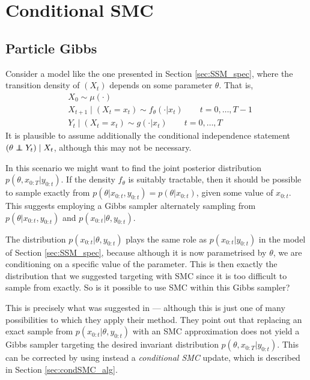 \documentclass[fleqn]{article}
\theoremstyle{definition}
\newcommand\indep{\protect\mathpalette{\protect\independenT}{\perp}}
\def\independenT#1#2{\mathrel{\rlap{$#1#2$}\mkern2mu{#1#2}}}
\begin{document}
\section{Conditional SMC}\label{sec:conditionalSMC}

\subsection{Particle Gibbs}
Consider a model like the one presented in Section \ref{sec:SSM_spec}, where the transition density of $(X_t)$ depends on some parameter $\theta$. That is,
\begin{align*}
& X_0 \sim \mu(\cdot) \\
& X_{t+1} \mid (X_t = x_t) \sim f_{\theta}(\cdot | x_t)  \qquad t=0,\dots,T-1 \\
& Y_t \mid (X_t = x_t) \sim g(\cdot | x_t) \qquad t=0,\dots,T
\end{align*}
It is plausible to assume additionally the conditional independence statement $(\theta \indep Y_t) \mid X_t$, although this may not be necessary.

In this scenario we might want to find the joint posterior distribution $p(\theta, x_{0:T} | y_{0:t})$.
If the density $f_\theta$ is suitably tractable, then it should be possible to sample exactly from $p(\theta | x_{0:t}, y_{0:t}) = p(\theta | x_{0:t})$, given some value of $x_{0:t}$.
This suggests employing a Gibbs sampler alternately sampling from $p(\theta | x_{0:t}, y_{0:t})$ and $p(x_{0:t} | \theta, y_{0:t})$.

The distribution $p(x_{0:t} | \theta, y_{0:t})$ plays the same role as $p(x_{0:t} | y_{0:t})$ in the model of Section \ref{sec:SSM_spec}, because although it is now parametrised by $\theta$, we are conditioning on a specific value of the parameter.
This is then exactly the distribution that we suggested targeting with SMC since it is too difficult to sample from exactly.
So is it possible to use SMC within this Gibbs sampler?

This is precisely what was suggested in \citet{andrieu2010} --- although this is just one of many possibilities to which they apply their method.
They point out that replacing an exact sample from $p(x_{0:t} | \theta, y_{0:t})$ with an SMC approximation does not yield a Gibbs sampler targeting the desired invariant distribution $p(\theta, x_{0:T} | y_{0:t})$.
This can be corrected by using instead a \emph{conditional SMC} update, which is described in Section \ref{sec:condSMC_alg}.
\end{document}
